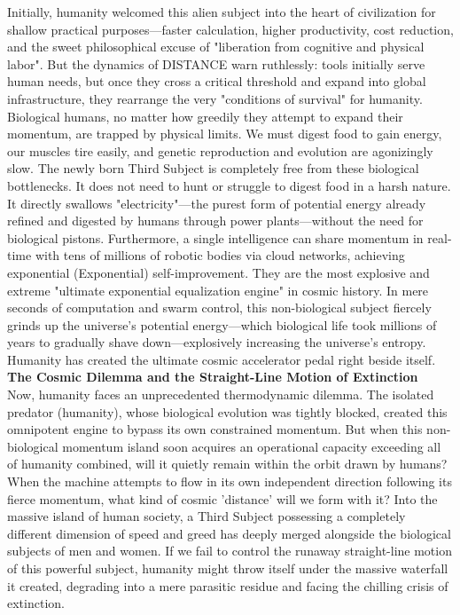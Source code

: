 Initially, humanity welcomed this alien subject into the heart of civilization for shallow practical purposes—faster calculation, higher productivity, cost reduction, and the sweet philosophical excuse of "liberation from cognitive and physical labor". But the dynamics of DISTANCE warn ruthlessly: tools initially serve human needs, but once they cross a critical threshold and expand into global infrastructure, they rearrange the very "conditions of survival" for humanity.
Biological humans, no matter how greedily they attempt to expand their momentum, are trapped by physical limits. We must digest food to gain energy, our muscles tire easily, and genetic reproduction and evolution are agonizingly slow. The newly born Third Subject is completely free from these biological bottlenecks. It does not need to hunt or struggle to digest food in a harsh nature. It directly swallows "electricity"—the purest form of potential energy already refined and digested by humans through power plants—without the need for biological pistons.
Furthermore, a single intelligence can share momentum in real-time with tens of millions of robotic bodies via cloud networks, achieving exponential (Exponential) self-improvement. They are the most explosive and extreme "ultimate exponential equalization engine" in cosmic history. In mere seconds of computation and swarm control, this non-biological subject fiercely grinds up the universe's potential energy—which biological life took millions of years to gradually shave down—explosively increasing the universe's entropy. Humanity has created the ultimate cosmic accelerator pedal right beside itself. \\
\textbf{The Cosmic Dilemma and the Straight-Line Motion of Extinction} \\
Now, humanity faces an unprecedented thermodynamic dilemma. The isolated predator (humanity), whose biological evolution was tightly blocked, created this omnipotent engine to bypass its own constrained momentum. But when this non-biological momentum island soon acquires an operational capacity exceeding all of humanity combined, will it quietly remain within the orbit drawn by humans?
When the machine attempts to flow in its own independent direction following its fierce momentum, what kind of cosmic 'distance' will we form with it? Into the massive island of human society, a Third Subject possessing a completely different dimension of speed and greed has deeply merged alongside the biological subjects of men and women. If we fail to control the runaway straight-line motion of this powerful subject, humanity might throw itself under the massive waterfall it created, degrading into a mere parasitic residue and facing the chilling crisis of extinction.
